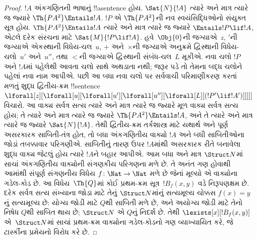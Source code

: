 \documentclass[../../../include/open-logic-section]{subfiles}
\begin{document}
\begin{proof}
$!A$ અંકગણિતની ભાષાનું !!a{sentence} હોય. $\Sat{N}{!A}$ ત્યારે
અને માત્ર ત્યારે જ જ્યારે $\Th{PA^2} \Entails !A$. $!P$ એ
$\Th{PA^2}$ની નવ સ્વયંસિદ્ધિઓનો સંયુક્ત સૂત્ર હોય. $\Th{PA^2} \Entails !A$
ત્યારે અને માત્ર ત્યારે જ જ્યારે $\Entails !P \lif
!A$, એટલે દરેક સંરચના માટે
$\Sat{M}{!P \lif !A}$. 
હવે~$\Obj{0}$ની જગ્યાએ~$z$, $\prime$ની જગ્યાએ એકસ્થાની
વિધેય-ચલ~$u$, $+$ અને~$\times$ની જગ્યાએ અનુક્રમે દ્વિસ્થાની
વિધેય-ચલો~$u'$ અને~$u''$, તથા $<$ની જગ્યાએ દ્વિસ્થાની સંબંધ-ચલ~$L$
મૂકીએ. નવા ચલો $!P$ અને $!A$માં પહેલેથી આવતા ચલો સાથે અથડાતા
નથી; જરૂર પડે તો તેમના બદ્ધ ચલોને પહેલાં નવા નામ આપીએ.
પછી આ બધા નવા ચલો પર સર્વવાચી પરિમાણીકરણ કરતાં મળતું શુદ્ધ
દ્વિતીય-ક્રમ !!{sentence}
$\lforall[z][\lforall[u][\lforall[u'][\lforall[u''][\lforall[L][(!P' \lif !A')]]]]]$
વિચારો. આ વાક્ય સર્વત્ર સત્ય ત્યારે અને માત્ર ત્યારે જ જ્યારે મૂળ વાક્ય
સર્વત્ર સત્ય હોય; તે ત્યારે અને માત્ર ત્યારે જ જ્યારે
$\Th{PA^2} \Entails !A$, અને તે ત્યારે અને માત્ર ત્યારે જ જ્યારે
$\Sat{N}{!A}$. તેથી દ્વિતીય-ક્રમ તર્કશાસ્ત્ર માટે યથાર્થ અને પૂર્ણ
અસરકારક સાબિતી-તંત્ર હોત, તો બધા અંકગણિતીય વાક્યો $!A$ અને
બધી સાબિતીઓના જોડાં તબક્કાવાર પરિગણીએ. સાબિતીનું તારણ ઉપર
$!A$માંથી અસરકારક રીતે બનાવેલા શુદ્ધ વાક્ય જેટલું હોય ત્યારે
$!A$ને બહાર આપીએ. આમ બધા અને માત્ર $\Struct N$માં સાચાં
અંકગણિતીય વાક્યોની સંગણકીય પરિગણના મળે છે. તે અનંત ગણ હોવાથી
આમાંથી સંપૂર્ણ સંગણનીય વિધેય
$f\colon\Nat\to\Nat$ મળે છે જેનાં મૂલ્યો એ વાક્યોના ગડેલ-કોડ છે.
આ વિધેય~$\Th{Q}$માં કોઈ પ્રથમ-ક્રમ સૂત્ર~$!B_f(x,y)$ વડે
નિરૂપણક્ષમ છે. દરેક સર્વત્ર સત્ય સંખ્યાના જોડા માટે તેનું
$\Struct N$માંનું સત્યમૂલ્ય ચોક્કસ $f(x)=y$નું સત્યમૂલ્ય છે:
યોગ્ય જોડી માટે $Q$થી સાબિતી મળે છે, અને અયોગ્ય જોડી માટે
તેનો નિષેધ $Q$થી સાબિત થાય છે; $\Struct N$ એ $Q$નું નિદર્શ છે.
તેથી $\lexists[x][!B_f(x,y)]$ એ~$\Struct N$માં સાચાં પ્રથમ-ક્રમ
વાક્યોના ગડેલ-કોડનો ગણ વ્યાખ્યાયિત કરે, જે ટાર્સ્કીના પ્રમેયનો
વિરોધ કરે છે.
\end{proof}
\end{document}

